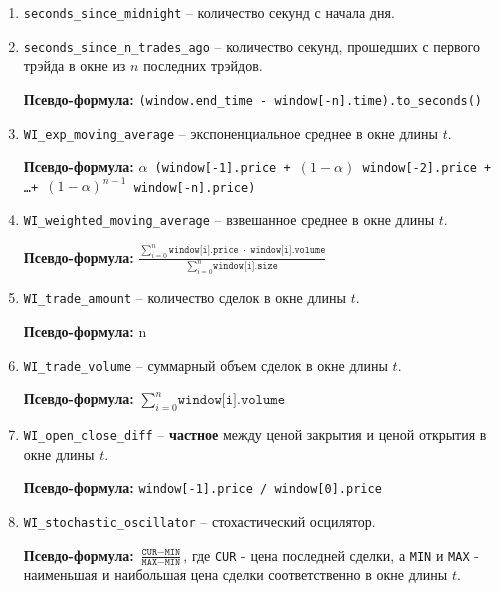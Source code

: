\begin{enumerate}
    \item \texttt{seconds\_since\_midnight} -- количество секунд с начала дня.
    \item \texttt{seconds\_since\_n\_trades\_ago} -- количество секунд, прошедших с первого трэйда в окне из $n$ последних трэйдов.
    
    \textbf{Псевдо-формула:} \texttt{(window.end\_time - window[-n].time).to\_seconds()}

    \item \texttt{WI\_exp\_moving\_average} -- экспоненциальное среднее в окне длины $t$. 
    
    \textbf{Псевдо-формула:} \texttt{$\alpha$ (window[-1].price + $(1 - \alpha)$ window[-2].price + \dots + $(1 - \alpha)^{n - 1}$ window[-n].price)}

    \item \texttt{WI\_weighted\_moving\_average} -- взвешанное среднее в окне длины $t$.

    \textbf{Псевдо-формула:} $\frac{\sum\limits_{i=0}^{n} \texttt{window[i].price} \; \cdot \; \texttt{window[i].volume}}{\sum\limits_{i=0}^{n}\texttt{window[i].size}}$

    \item \texttt{WI\_trade\_amount} -- количество сделок в окне длины $t$.

    \textbf{Псевдо-формула:} n

    \item \texttt{WI\_trade\_volume} -- суммарный объем сделок в окне длины $t$.

    \textbf{Псевдо-формула:} $\sum\limits_{i=0}^{n}\texttt{window[i].volume}$

    \item \texttt{WI\_open\_close\_diff} -- \textbf{частное} между ценой закрытия и ценой открытия в окне длины $t$.

    \textbf{Псевдо-формула:} \texttt{window[-1].price / window[0].price}

    \item \texttt{WI\_stochastic\_oscillator} -- стохастический осцилятор.

    \textbf{Псевдо-формула:} $\frac{\texttt{CUR} - \texttt{MIN}}{\texttt{MAX} - \texttt{MIN}}$, где \texttt{CUR} - цена последней сделки, а \texttt{MIN} и \texttt{MAX} - наименьшая и наибольшая цена сделки соответственно в окне длины $t$.

\end{enumerate}

